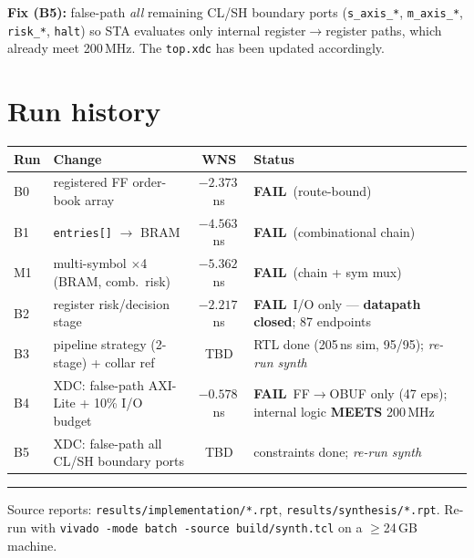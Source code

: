 \documentclass[10pt,a4paper]{article}
\newcommand{\fail}{\textcolor{badred}{\textbf{FAIL}}}
\begin{document}
\noindent\textbf{Fix (B5):} false-path \emph{all} remaining CL/SH boundary
ports (\texttt{s\_axis\_*}, \texttt{m\_axis\_*}, \texttt{risk\_*},
\texttt{halt}) so STA evaluates only internal register$\to$register paths, which
already meet 200\,MHz. The \texttt{top.xdc} has been updated accordingly.

\section*{Run history}
\begin{center}
\renewcommand{\arraystretch}{1.2}
\begin{tabular}{@{}l l c l@{}}
\toprule
\textbf{Run} & \textbf{Change} & \textbf{WNS} & \textbf{Status} \\
\midrule
B0 & registered FF order-book array          & $-2.373$\,ns & \fail\ (route-bound) \\
B1 & \texttt{entries[]} $\to$ BRAM           & $-4.563$\,ns & \fail\ (combinational chain) \\
M1 & multi-symbol $\times$4 (BRAM, comb.\ risk) & $-5.362$\,ns & \fail\ (chain + sym mux) \\
B2 & register risk/decision stage            & $-2.217$\,ns & \fail\ I/O only --- \textbf{datapath closed}; 87 endpoints \\
B3 & pipeline strategy (2-stage) + collar ref & TBD          & RTL done (205\,ns sim, 95/95); \emph{re-run synth} \\
B4 & XDC: false-path AXI-Lite + 10\% I/O budget & $-0.578$\,ns & \fail\ FF$\to$OBUF only (47 eps); internal logic \textbf{MEETS} 200\,MHz \\
B5 & XDC: false-path all CL/SH boundary ports  & TBD          & constraints done; \emph{re-run synth} \\
\bottomrule
\end{tabular}
\end{center}

\vfill
\textcolor{rulegray}{\rule{\linewidth}{0.5pt}}
{\footnotesize\color{rulegray}
Source reports: \texttt{results/implementation/*.rpt}, \texttt{results/synthesis/*.rpt}.
Re-run with \texttt{vivado -mode batch -source build/synth.tcl} on a $\geq$24\,GB machine.}
\end{document}
